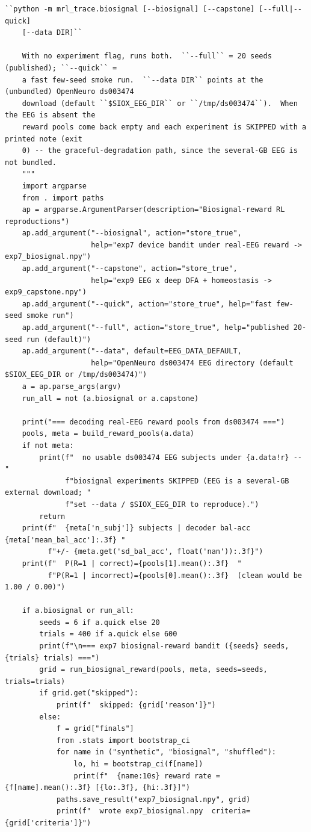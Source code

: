 \begin{lstlisting}[caption={mrl\_trace/biosignal.py},label={lst:siox-src-biosignal}]
    ``python -m mrl_trace.biosignal [--biosignal] [--capstone] [--full|--quick]
    [--data DIR]``

    With no experiment flag, runs both.  ``--full`` = 20 seeds (published); ``--quick`` =
    a fast few-seed smoke run.  ``--data DIR`` points at the (unbundled) OpenNeuro ds003474
    download (default ``$SIOX_EEG_DIR`` or ``/tmp/ds003474``).  When the EEG is absent the
    reward pools come back empty and each experiment is SKIPPED with a printed note (exit
    0) -- the graceful-degradation path, since the several-GB EEG is not bundled.
    """
    import argparse
    from . import paths
    ap = argparse.ArgumentParser(description="Biosignal-reward RL reproductions")
    ap.add_argument("--biosignal", action="store_true",
                    help="exp7 device bandit under real-EEG reward -> exp7_biosignal.npy")
    ap.add_argument("--capstone", action="store_true",
                    help="exp9 EEG x deep DFA + homeostasis -> exp9_capstone.npy")
    ap.add_argument("--quick", action="store_true", help="fast few-seed smoke run")
    ap.add_argument("--full", action="store_true", help="published 20-seed run (default)")
    ap.add_argument("--data", default=EEG_DATA_DEFAULT,
                    help="OpenNeuro ds003474 EEG directory (default $SIOX_EEG_DIR or /tmp/ds003474)")
    a = ap.parse_args(argv)
    run_all = not (a.biosignal or a.capstone)

    print("=== decoding real-EEG reward pools from ds003474 ===")
    pools, meta = build_reward_pools(a.data)
    if not meta:
        print(f"  no usable ds003474 EEG subjects under {a.data!r} -- "
              f"biosignal experiments SKIPPED (EEG is a several-GB external download; "
              f"set --data / $SIOX_EEG_DIR to reproduce).")
        return
    print(f"  {meta['n_subj']} subjects | decoder bal-acc {meta['mean_bal_acc']:.3f} "
          f"+/- {meta.get('sd_bal_acc', float('nan')):.3f}")
    print(f"  P(R=1 | correct)={pools[1].mean():.3f}  "
          f"P(R=1 | incorrect)={pools[0].mean():.3f}  (clean would be 1.00 / 0.00)")

    if a.biosignal or run_all:
        seeds = 6 if a.quick else 20
        trials = 400 if a.quick else 600
        print(f"\n=== exp7 biosignal-reward bandit ({seeds} seeds, {trials} trials) ===")
        grid = run_biosignal_reward(pools, meta, seeds=seeds, trials=trials)
        if grid.get("skipped"):
            print(f"  skipped: {grid['reason']}")
        else:
            f = grid["finals"]
            from .stats import bootstrap_ci
            for name in ("synthetic", "biosignal", "shuffled"):
                lo, hi = bootstrap_ci(f[name])
                print(f"  {name:10s} reward rate = {f[name].mean():.3f} [{lo:.3f}, {hi:.3f}]")
            paths.save_result("exp7_biosignal.npy", grid)
            print(f"  wrote exp7_biosignal.npy  criteria={grid['criteria']}")


\end{lstlisting}
